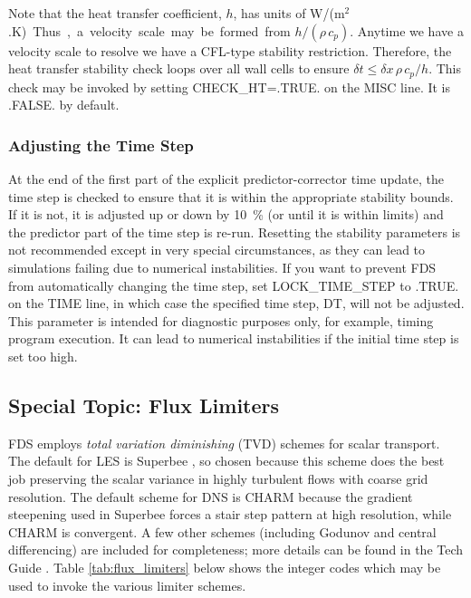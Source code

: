 \documentclass[11pt]{book}
\begin{document}
Note that the heat transfer coefficient, $h$, has units of \si{W/(m$^2$.K)}.  Thus, a velocity scale may be formed from $h/(\rho\, c_p)$. Anytime we have a velocity scale to resolve we have a CFL-type stability restriction. Therefore, the heat transfer stability check loops over all wall cells to ensure $\delta t \le \delta x \,\rho \,c_p/h$. This check may be invoked by setting {\ct CHECK\_HT=.TRUE.} on the {\ct MISC} line. It is {\ct .FALSE.} by default.


\subsubsection{Adjusting the Time Step}

At the end of the first part of the explicit predictor-corrector time update, the time step is checked to ensure that it is within the appropriate stability bounds. If it is not, it is adjusted up or down by 10~\% (or until it is within limits) and the predictor part of the time step is re-run. Resetting the stability parameters is not recommended except in very special circumstances, as they can lead to simulations failing due to numerical instabilities. If you want to prevent FDS from automatically changing the time step, set {\ct LOCK\_TIME\_STEP} to {\ct .TRUE.} on the {\ct TIME} line, in which case the specified time step, {\ct DT}, will not be adjusted. This parameter is intended for diagnostic purposes only, for example, timing program execution. It can lead to numerical instabilities if the initial time step is set too high.


\subsection{Special Topic: Flux Limiters}
\label{info:flux_limiters}

FDS employs \emph{total variation diminishing} (TVD) schemes for scalar transport.  The default for LES is Superbee \cite{Roe:1986}, so chosen because this scheme does the best job preserving the scalar variance in highly turbulent flows with coarse grid resolution.  The default scheme for DNS is CHARM \cite{Zhou:1995} because the gradient steepening used in Superbee forces a stair step pattern at high resolution, while CHARM is convergent.   A few other schemes (including Godunov and central differencing) are included for completeness; more details can be found in the Tech Guide \cite{FDS_Tech_Guide}.  Table \ref{tab:flux_limiters} below shows the integer codes which may be used to invoke the various limiter schemes.
\end{document}
